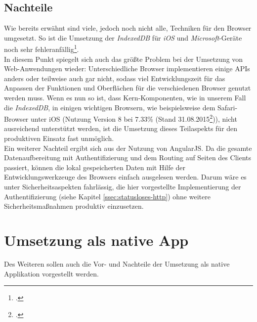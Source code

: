\subsection{Nachteile}
\label{sec:nachteile-SPA}
Wie bereits erwähnt sind viele, jedoch noch nicht alle, Techniken für den Browser umgesetzt. So ist die Umsetzung der \textit{IndexedDB} für \textit{iOS} und \textit{Microsoft}-Geräte noch sehr fehleranfällig\footcite{online:caniuse:indexedDB}. \\
In diesem Punkt spiegelt sich auch das größte Problem bei der Umsetzung von Web-Anwendungen wieder: Unterschiedliche Browser implementieren einige \ac{API}s anders oder teilweise auch gar nicht, sodass viel Entwicklungszeit für das Anpassen der Funktionen und Oberflächen für die verschiedenen Browser genutzt werden muss. Wenn es nun so ist, dass Kern-Komponenten, wie in unserem Fall die \textit{IndexedDB}, in einigen wichtigen Browsern, wie beispielsweise dem Safari-Browser unter \gls{iOS} (Nutzung Version 8 bei 7.33\% (Stand 31.08.2015\footcite{online:caniuse:indexedDB})), nicht ausreichend unterstützt werden, ist die Umsetzung dieses Teilaspekts für den produktiven Einsatz fast unmöglich. \\
Ein weiterer Nachteil ergibt sich aus der Nutzung von AngularJS. Da die gesamte Datenaufbereitung mit Authentifizierung und dem Routing auf Seiten des Clients passiert, können die lokal gespeicherten Daten mit Hilfe der Entwicklungswerkzeuge des Browsers einfach ausgelesen werden. Darum wäre es unter Sicherheitsaspekten fahrlässig, die hier vorgestellte Implementierung der Authentifizierung (siehe Kapitel \ref{ssec:statusloses-http}) ohne weitere Sicherheitsmaßnahmen produktiv einzusetzen.

\section{Umsetzung als native App}
\label{sec:gegenueberstellung-native-app}
Des Weiteren sollen auch die Vor- und Nachteile der Umsetzung als native Applikation vorgestellt werden.

